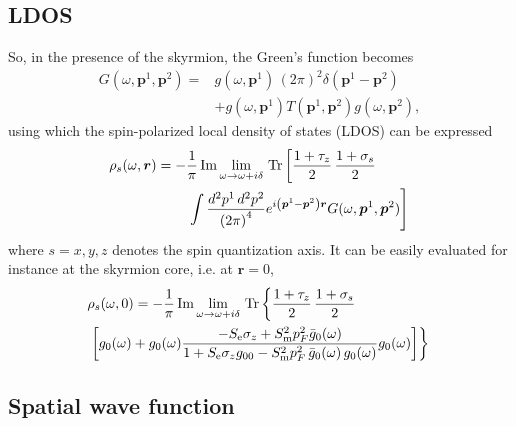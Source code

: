 \documentclass[twocolumn,showpacs,floatfix,nofootinbib,longbibliography]{revtex4-1}
\begin{document}
\subsection{LDOS} \label{sec:LDOS}
So, in the presence of the skyrmion, the Green's function becomes
\begin{align}
	G(\omega,\bm p^1,\bm p^2) =& g(\omega,\bm p^1)\,(2\pi)^2\delta(\bm p^1-\bm p^2) \nonumber \\ 
	          &  +g(\omega,\bm p^1) T(\bm p^1,\bm p^2) g(\omega,\bm p^2),
	\label{G}
\end{align}
using which the spin-polarized local density of states (LDOS) can be expressed
\begin{align}
	\rho_s(\omega,\bm r) = -&\frac{1}{\pi}\,{\rm Im}\lim_{\omega\rightarrow \omega+i\delta}{\rm\,Tr} \left[ \frac{1+\tau_z}{2}\,\frac{1+\sigma_s}{2} \right. \label{rhor} \\
	&\left.\int \frac{d^2p^1\,d^2p^2}{\left( 2\pi \right)^4} e^{i\left( \bm p^1-\bm p^2 \right)\bm r} G(\omega,\bm p^1,\bm p^2)\right]\, \nonumber 
\end{align}
where $s=x,y,z$ denotes the spin quantization axis. It can be easily evaluated for instance at the skyrmion core, i.e. at $\bm r=0$,
\begin{align}
	& \rho_s(\omega,0) = -\frac{1}{\pi}\,{\rm Im}\lim_{\omega\rightarrow \omega+i\delta}{\rm \,Tr} \left\{  \frac{1+\tau_z}{2}\,\frac{1+\sigma_s}{2}  \right. \label{spldos} \\
	&\left.\left[g_0(\omega)+g_0(\omega)  \frac{-S_{\rm e}\sigma_z+S^2_{\rm m}p_F^2\bar g_{0}(\omega)}{1+S_{\rm e}\sigma_zg_{00}-S^2_{\rm m}p_F^2\,\bar g_{0}(\omega)\, g_{0}(\omega)} g_0(\omega)  \right]\right\}\, \nonumber 
\end{align}

\subsection{Spatial wave function} \label{sec:wf}



%

\end{document}
